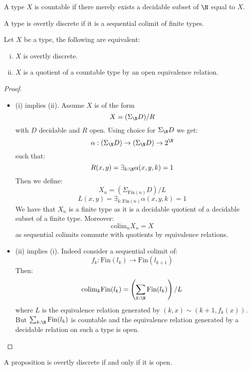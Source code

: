\begin{definition}
A type $X$ is countable if there merely exists a decidable subset of $\N$ equal to $X$.
\end{definition}

\begin{definition}
A type is overtly discrete if it is a sequential colimit of finite types.
\end{definition}

\begin{lemma}\label{overtly-discrete-colimit-finite}
Let $X$ be a type, the following are equivalent:
\begin{enumerate}[(i)]
\item $X$ is overtly discrete.
\item $X$ is a quotient of a countable type by an open equivalence relation.
\end{enumerate}
\end{lemma}

\begin{proof}
\begin{itemize}
\item (i) implies (ii). Assume $X$ is of the form
\[X  = (\Sigma_\N D)/R\]
with $D$ decidable and $R$ open. Using choice for $\Sigma_\N D$ we get:
\[\alpha : (\Sigma_\N D) \to (\Sigma_\N D)\to 2^\N\]
such that:
\[R(x,y) = \exists_{k:\N} \alpha(x,y,k) = 1\]
Then we define:
\[X_n = (\Sigma_{\mathrm{Fin}(n)} D) / L\]
\[L(x,y) = \exists_{k:\mathrm{Fin}(n)} \alpha(x,y,k) = 1\]
We have that $X_n$ is a finite type as it is a decidable quotient of a decidable subset of a finite type. Moreover:
\[\mathrm{colim}_n X_n = X\]
as sequential colimits commute with quotients by equivalence relations.
\item (ii) implies (i). Indeed consider a sequential colimit of:
\[f_k : \mathrm{Fin}(l_k) \to \mathrm{Fin}(l_{k+1})\]
Then:
\[\mathrm{colim}_k \mathrm{Fin}(l_k)  =  \left(\sum_{k:\N} \mathrm{Fin}(l_k)\right) / L\]
where $L$ is the equivalence relation generated by $(k,x) \sim (k+1,f_k(x))$. But $\sum_{k:\N} \mathrm{Fin}(l_k)$ is countable and the equivalence relation generated by a decidable relation on such a type is open.
\end{itemize}
\end{proof}

\begin{remark}
A proposition is overtly discrete if and only if it is open.
\end{remark}

